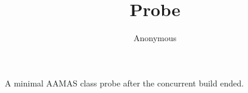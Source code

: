 \documentclass[sigconf,anonymous]{aamas}
\title{Probe}
\author{Anonymous}
\begin{document}
\maketitle
A minimal AAMAS class probe after the concurrent build ended.
\end{document}
